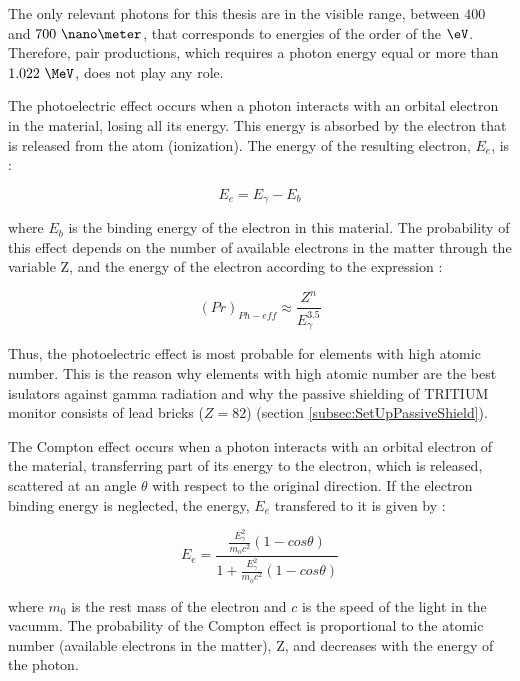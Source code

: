 The only relevant photons for this thesis are in the visible range, between $400$ and $700~\nano\meter$, that corresponds to energies of the order of the $\eV$. Therefore, pair productions, which requires a photon energy equal or more than $1.022~\MeV$, does not play any role.

The photoelectric effect occurs when a photon interacts with an orbital electron in the material, losing all its energy. This energy is absorbed by the electron that is released from the atom (ionization). The energy of the resulting electron, $E_e$, is \cite{Knoll, Leo}:


\begin{equation}
E_e = E_\gamma - E_b 
\label{eq:PhotoelectricEffect}
\end{equation}

where $E_b$ is the binding energy of the electron in this material. The probability of this effect depends on the number of available electrons in the matter through the variable Z, and the energy of the electron according to the expression \cite{Knoll}:

\begin{equation}
\left(Pr\right)_{Ph-eff} \approx \frac{Z^n}{E_\gamma^{3.5}}
\label{eq:PhotoelectricProb}
\end{equation}

Thus, the photoelectric effect is most probable for elements with high atomic number. This is the reason why elements with high atomic number are the best isulators against gamma radiation and why the passive shielding of TRITIUM monitor consists of lead bricks ($Z=82$) (section \ref{subsec:SetUpPassiveShield}). %

The Compton effect occurs when a photon interacts with an orbital electron of the material, transferring part of its energy to the electron, which is released, scattered at an angle $\theta$ with respect to the original direction. If the electron binding energy is neglected, the energy, $E_e$ transfered to it is given by \cite{Knoll, Leo}:

\begin{equation}
E_e=\frac{\frac{E_\gamma^2}{m_oc^2}\left(1-cos\theta\right)}{1+ \frac{E_\gamma^2}{m_oc^2}\left(1-cos\theta\right)}
\label{eq:ComptonEffect}
\end{equation}

where $m_0$ is the rest mass of the electron and $c$ is the speed of the light in the vacumm. The probability of the Compton effect is proportional to the atomic number (available electrons in the matter), Z,  and decreases with the energy of the photon. 


